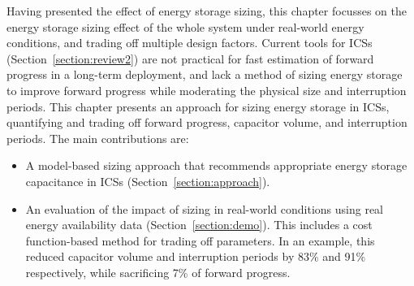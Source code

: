 Having presented the effect of energy storage sizing, this chapter focusses on the energy storage sizing effect of the whole system under real-world energy conditions, and trading off multiple design factors. 
Current tools for ICSs (Section~\ref{section:review2}) are not practical for fast estimation of forward progress in a long-term deployment, and lack a method of sizing energy storage to improve forward progress while moderating the physical size and interruption periods. 
This chapter presents an approach for sizing energy storage in ICSs, quantifying and trading off forward progress, capacitor volume, and interruption periods. 
The main contributions are:
\begin{itemize}
    \item A model-based sizing approach that recommends appropriate energy storage capacitance in ICSs (Section~\ref{section:approach}).
    \item An evaluation of the impact of sizing in real-world conditions using real energy availability data (Section~\ref{section:demo}). 
    This includes a cost function-based method for trading off parameters. 
    In an example, this reduced capacitor volume and interruption periods by 83\% and 91\% respectively, while sacrificing 7\% of forward progress.
\end{itemize}
